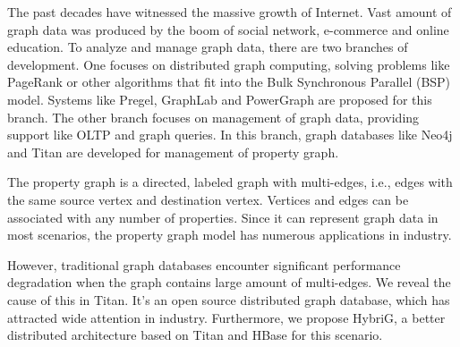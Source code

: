 \begin{eabstract}
	The past decades have witnessed the massive growth of Internet. Vast amount of graph data was produced by the boom of social network, e-commerce and online education. To analyze and manage graph data, there are two branches of development. One focuses on distributed graph computing, solving problems like PageRank or other algorithms that fit into the Bulk Synchronous Parallel (BSP) model. Systems like Pregel, GraphLab and PowerGraph are proposed for this branch. The other branch focuses on management of graph data, providing support like OLTP and graph queries. In this branch, graph databases like Neo4j and Titan are developed for management of property graph.

	The property graph is a directed, labeled graph with multi-edges, i.e., edges with the same source vertex and destination vertex. Vertices and edges can be associated with any number of properties. Since it can represent graph data in most scenarios, the property graph model has numerous applications in industry.

	However, traditional graph databases encounter significant performance degradation when the graph contains large amount of multi-edges. We reveal the cause of this in Titan. It’s an open source distributed graph database, which has attracted wide attention in industry. Furthermore, we propose HybriG, a better distributed architecture based on Titan and HBase for this scenario.


\end{eabstract}
